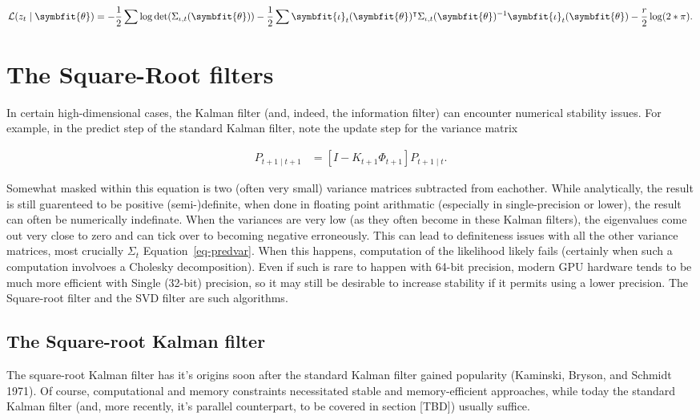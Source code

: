 \documentclass[
]{report}
\newcommand{\bv}[1]{\symbfit{#1}}
\theoremstyle{plain}
\theoremstyle{plain}
\theoremstyle{plain}
\theoremstyle{remark}
\begin{document}
\[\begin{split}
\mathcal L(z_t\mid\bv\theta) = -\frac12\sum \log\det(\Sigma_{\iota, t}(\bv\theta)) - \frac12 \sum\bv \iota_t(\bv\theta)^\intercal\Sigma_{\iota, t}(\bv\theta)^{-1} \bv \iota_t(\bv\theta) - \frac{r}{2}\log(2*\pi).
\end{split}
\]

\section{The Square-Root filters}\label{the-square-root-filters}

In certain high-dimensional cases, the Kalman filter (and, indeed, the
information filter) can encounter numerical stability issues. For
example, in the predict step of the standard Kalman filter, note the
update step for the variance matrix

\[\begin{split}
P_{t+1\mid t+1} &= [I- K_{t+1}\Phi_{t+1}]P_{t+1\mid t}.
\end{split}
\]

Somewhat masked within this equation is two (often very small) variance
matrices subtracted from eachother. While analytically, the result is
still guarenteed to be positive (semi-)definite, when done in floating
point arithmatic (especially in single-precision or lower), the result
can often be numerically indefinate. When the variances are very low (as
they often become in these Kalman filters), the eigenvalues come out
very close to zero and can tick over to becoming negative erroneously.
This can lead to definiteness issues with all the other variance
matrices, most crucially \(\Sigma_t\) Equation~\ref{eq-predvar}. When
this happens, computation of the likelihood likely fails (certainly when
such a computation involvoes a Cholesky decomposition). Even if such is
rare to happen with 64-bit precision, modern GPU hardware tends to be
much more efficient with Single (32-bit) precision, so it may still be
desirable to increase stability if it permits using a lower precision.
The Square-root filter and the SVD filter are such algorithms.

\subsection{The Square-root Kalman
filter}\label{the-square-root-kalman-filter}

The square-root Kalman filter has it's origins soon after the standard
Kalman filter gained popularity (Kaminski, Bryson, and Schmidt 1971). Of
course, computational and memory constraints necessitated stable and
memory-efficient approaches, while today the standard Kalman filter
(and, more recently, it's parallel counterpart, to be covered in section
{[}TBD{]}) usually suffice.
\end{document}
